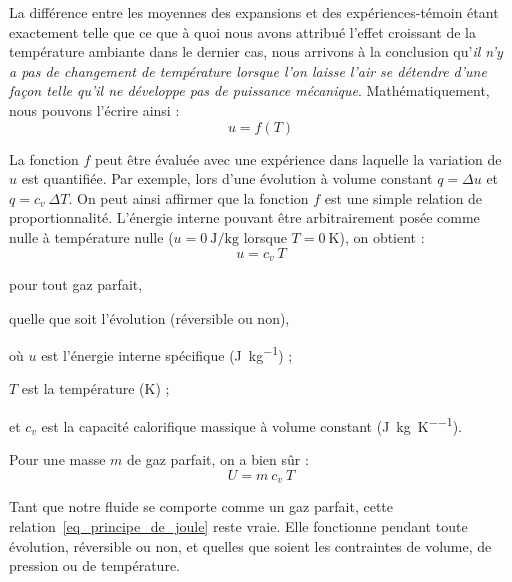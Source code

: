 La différence entre les moyennes des expansions et des expériences-témoin étant exactement telle que ce que à quoi nous avons attribué l’effet croissant de la température ambiante dans le dernier cas, nous arrivons à la conclusion qu’\emph{il n’y a pas de changement de température lorsque l’on laisse l’air se détendre d’une façon telle qu’il ne développe pas de puissance mécanique}.
		Mathématiquement, nous pouvons l’écrire ainsi :
		\begin{equation}
			u = f(T)
		\end{equation}

		La fonction $f$ peut être évaluée avec une expérience dans laquelle la variation de~$u$ est quantifiée. Par exemple, lors d’une évolution à volume constant $q = \Delta u$ et $q = c_v \ \Delta T$. On peut ainsi affirmer que la fonction $f$ est une simple relation de proportionnalité. L’énergie interne pouvant être arbitrairement posée comme nulle à température nulle ($u = \SI{0}{\joule\per\kilogram}$ lorsque $T = \SI{0}{\kelvin}$), on obtient :
		\begin{equation}
			u = c_v \ T
			\label{eq_principe_de_joule}
		\end{equation}
		\begin{equationterms}
			\item pour tout gaz parfait,
			\item quelle que soit l’évolution (réversible ou non),
			\item où \tab $u$ 	\tab est l’énergie interne spécifique (\si{\joule\per\kilogram}) ;
			\item 	\tab $T$ 	\tab est la température (\si{\kelvin}) ;
			\item et \tab $c_v$ 	\tab est la capacité calorifique massique à volume constant (\si{\joule\per\kilogram\per\kelvin}).
		\end{equationterms}

		Pour une masse $m$ de gaz parfait, on a bien sûr :
		\begin{equation}
			U = m \ c_v \ T
			\label{eq_principe_de_joule_m}
		\end{equation}

		Tant que notre fluide se comporte comme un gaz parfait, cette relation~\ref{eq_principe_de_joule} reste vraie. Elle fonctionne pendant toute évolution, réversible ou non, et quelles que soient les contraintes de volume, de pression ou de température.

